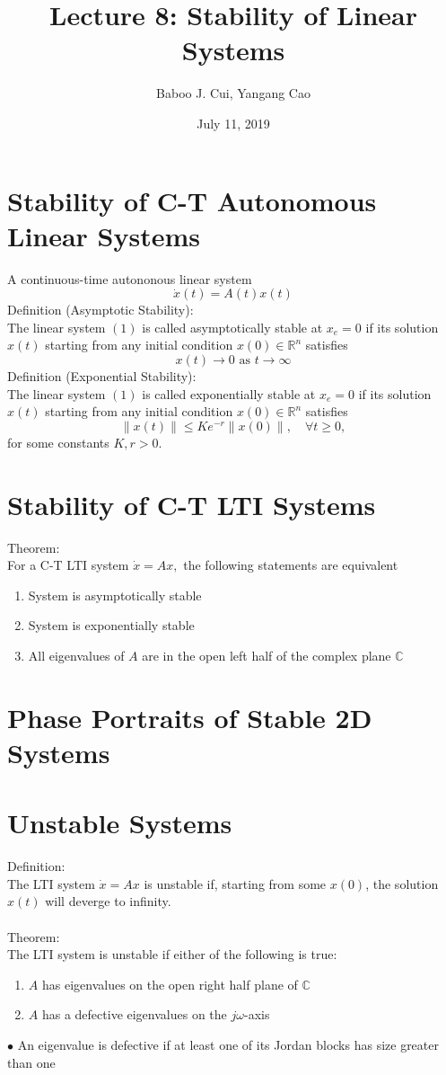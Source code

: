\documentclass[10pt,a4paper,oneside]{article}
\date{July 11, 2019}
\author{Baboo J. Cui, Yangang Cao}
\title{Lecture 8: Stability of Linear Systems}
\begin{document}
\maketitle
\tableofcontents
\newpage
\section{Stability of C-T Autonomous Linear Systems}
A continuous-time autononous linear system
\begin{equation}
\dot{x}(t)=A(t) x(t)
\end{equation}
Definition (Asymptotic Stability):\\
The linear system $(1)$ is called asymptotically stable at $x_{e}=0$ if its solution $x(t)$ starting from any initial condition $x(0) \in \mathbb{R}^{n}$ satisfies
\[
x(t) \rightarrow 0 \text { as } t \rightarrow \infty
\]
Definition (Exponential Stability):\\
The linear system $(1)$ is called exponentially stable at $x_{e}=0$ if its solution
$x(t)$ starting from any initial condition $x(0) \in \mathbb{R}^{n}$ satisfies
\[
\|x(t)\| \leq K e^{-r}\|x(0)\|, \quad \forall t \geq 0,
\]
for some constants $K, r>0$.
\section{Stability of C-T LTI Systems}
Theorem:\\
For a C-T LTI system $\dot{x}=A x,$ the following statements are equivalent
\begin{enumerate}
\item System is asymptotically stable
\item System is exponentially stable
\item All eigenvalues of $A$ are in the open left half of the complex plane $\mathbb{C}$
\end{enumerate}
\section{Phase Portraits of Stable 2D Systems}
\section{Unstable Systems}
Definition:\\
The LTI system $\dot{x}=Ax$ is unstable if, starting from some $x(0)$, the solution $x(t)$ will deverge to infinity.\\
\\
Theorem:\\
The LTI system is unstable if either of the following is true:
\begin{enumerate}
\item $A$ has eigenvalues on the open right half plane of $\mathbb{C}$
\item $A$ has a defective eigenvalues on the $j\omega$-axis
\end{enumerate}
$\bullet$ An eigenvalue is defective if at least one of its Jordan blocks has size greater than one
\end{document}
